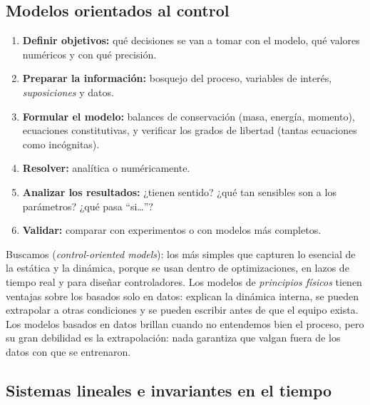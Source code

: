 \subsection{Modelos orientados al control}

\begin{receta}
\begin{enumerate}
  \item \textbf{Definir objetivos:} qué decisiones se van a tomar con el modelo, qué valores numéricos y con qué precisión.
  \item \textbf{Preparar la información:} bosquejo del proceso, variables de interés, \emph{suposiciones} y datos.
  \item \textbf{Formular el modelo:} balances de conservación (masa, energía, momento), ecuaciones constitutivas, y verificar los grados de libertad (tantas ecuaciones como incógnitas).
  \item \textbf{Resolver:} analítica o numéricamente.
  \item \textbf{Analizar los resultados:} ¿tienen sentido? ¿qué tan sensibles son a los parámetros? ¿qué pasa ``si\ldots''?
  \item \textbf{Validar:} comparar con experimentos o con modelos más completos.
\end{enumerate}
\end{receta}

Buscamos  (\emph{control-oriented models}): los más simples que capturen lo esencial de la estática y la dinámica, porque se usan dentro de optimizaciones, en lazos de tiempo real y para diseñar controladores. Los modelos de \emph{principios físicos} tienen ventajas sobre los basados solo en datos: explican la dinámica interna, se pueden extrapolar a otras condiciones y se pueden escribir antes de que el equipo exista. Los modelos basados en datos brillan cuando no entendemos bien el proceso, pero su gran debilidad es la extrapolación: nada garantiza que valgan fuera de los datos con que se entrenaron.

\subsection{Sistemas lineales e invariantes en el tiempo}


